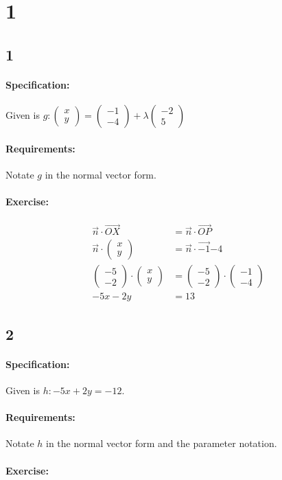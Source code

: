 \documentclass{article}
\newcommand{\vectorTwo}[2]{\begin{pmatrix}
    #1 \\ 
    #2
\end{pmatrix}}
\begin{document}
\section{1}
\subsection{1}

\paragraph{Specification:}
Given is $g: \vectorTwo{x}{y} = \vectorTwo{-1}{-4} + \lambda \vectorTwo{-2}{5}$

\paragraph{Requirements:}
Notate $g$ in the normal vector form.

\paragraph{Exercise:}
\begin{align}
    \vec{n} \cdot \vec{OX} &= \vec{n} \cdot \vec{OP} \\ 
    \vec{n} \cdot \vectorTwo{x}{y} &= \vec{n} \cdot \vec{-1}{-4} \\
    \vectorTwo{-5}{-2} \cdot \vectorTwo{x}{y} &= \vectorTwo{-5}{-2} \cdot \vectorTwo{-1}{-4} \\
    -5x - 2y &= 13
\end{align}

\subsection{2}

\paragraph{Specification:}
Given is $h: -5x + 2y = -12$.

\paragraph{Requirements:}
Notate $h$ in the normal vector form and the parameter notation.

\paragraph{Exercise:}
\end{document}
